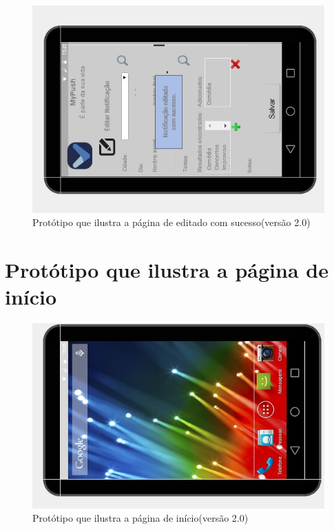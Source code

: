 \begin{apendicesenv}
    \begin{figure}[!htbp]
      \centering
      \includegraphics[scale=0.5, angle=-90]{editaveis/figuras/prototipo_alta_fidelidade_v2/2_15}
      \caption{Protótipo que ilustra a página de editado com sucesso(versão 2.0)}
      \label{v2}
    \end{figure}
    
      \section*{Protótipo que ilustra a página de início}

    \begin{figure}[!htbp]
      \centering
      \includegraphics[scale=0.5, angle=-90]{editaveis/figuras/prototipo_alta_fidelidade_v2/2_16}
      \caption{Protótipo que ilustra a página de início(versão 2.0)}
      \label{v2}
    \end{figure}



\end{apendicesenv}
